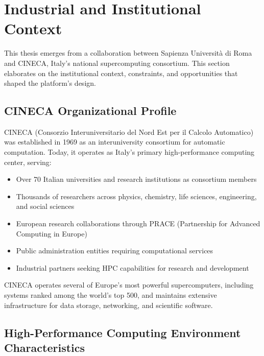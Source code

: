 
\section{Industrial and Institutional Context}
\label{sec:industrial-context}

This thesis emerges from a collaboration between Sapienza Università di Roma and CINECA, Italy's national supercomputing consortium. This section elaborates on the institutional context, constraints, and opportunities that shaped the platform's design.

\subsection{CINECA Organizational Profile}

CINECA (Consorzio Interuniversitario del Nord Est per il Calcolo Automatico) was established in 1969 as an interuniversity consortium for automatic computation. Today, it operates as Italy's primary high-performance computing center, serving:

\begin{itemize}
    \item Over 70 Italian universities and research institutions as consortium members
    \item Thousands of researchers across physics, chemistry, life sciences, engineering, and social sciences
    \item European research collaborations through PRACE (Partnership for Advanced Computing in Europe)
    \item Public administration entities requiring computational services
    \item Industrial partners seeking HPC capabilities for research and development
\end{itemize}

CINECA operates several of Europe's most powerful supercomputers, including systems ranked among the world's top 500, and maintains extensive infrastructure for data storage, networking, and scientific software.

\subsection{High-Performance Computing Environment Characteristics}

